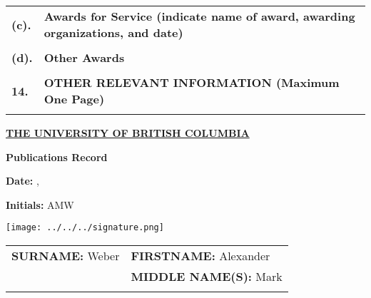 \documentclass[11pt,notitlepage,english]{report}
\makeatletter
\newcommand{\monthyeardate}{%
  \DTMenglishmonthname{\@dtm@month}, \@dtm@year
}
\makeatother
\begin{document}
\begin{tabular}{L{.5cm} L{18.9cm} }
  \\
  \textbf{(c).}  & \textbf{Awards for Service (indicate name of award, awarding organizations, and date)}                                      \\
  \\
  \textbf{(d).}  & \textbf{Other Awards}                                      \\
  \\
  \textbf{14.}  & \textbf{OTHER RELEVANT INFORMATION (Maximum One Page)}                                      \\
  \\
\end{tabular}

\pagebreak

\begin{center}
  \underline{\textbf{THE UNIVERSITY OF BRITISH COLUMBIA}}
  \vspace{10pt}

  \textbf{Publications Record}
\end{center}

\noindent %
\begin{minipage}[t]{0.33\textwidth}
  \raggedright
  \textbf{Date:} \monthyeardate
\end{minipage}%
\begin{minipage}[t]{0.33\textwidth}
  \begin{center}
    \textbf{Initials:} AMW \hspace{10pt} 
  \end{center}
\end{minipage}%
\begin{minipage}[t]{0.33\textwidth}
  \raggedleft
  \texttt{[image: ../../../signature.png]}
\end{minipage}

\vspace{15pt}


\begin{tabular}{L{8cm} L{6.9cm}}
  \textbf{SURNAME:} Weber                       & \textbf{FIRSTNAME:} Alexander      \\
                                                & \textbf{MIDDLE NAME(S):} Mark      \\
                                                \\
\end{tabular}
\end{document}
